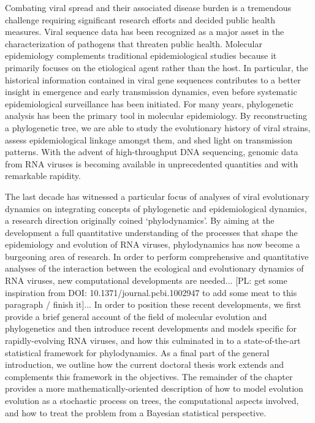 Combating viral spread and their associated disease burden is a tremendous challenge requiring significant research efforts and decided public health measures. 
Viral sequence data has been recognized as a major asset in the characterization of pathogens that threaten public health.
Molecular epidemiology complements traditional epidemiological studies because it primarily focuses on the etiological agent rather than the host. %
In particular, the historical information contained in viral gene sequences contributes to a better insight in emergence and early transmission dynamics, even before systematic epidemiological surveillance has been initiated. 
For many years, phylogenetic analysis has been the primary tool in molecular epidemiology. 
By reconstructing a phylogenetic tree, we are able to study the evolutionary history of viral strains, assess epidemiological linkage amongst them, and shed light on transmission patterns. 
With the advent of high-throughput DNA sequencing, genomic data from RNA viruses is becoming available in unprecedented quantities and with remarkable rapidity. 


The last decade has witnessed a particular focus of analyses of viral evolutionary dynamics on integrating concepts of phylogenetic and epidemiological dynamics, a research direction originally coined `phylodynamics'. %
By aiming at the development a full quantitative understanding of the processes that shape the epidemiology and evolution of RNA viruses,
phylodynamics has now become a burgeoning area of research.
In order to perform comprehensive and quantitative analyses of the interaction between the ecological and evolutionary dynamics of RNA viruses, new computational developments are needed... [PL: get some inspiration from  DOI: 10.1371/journal.pcbi.1002947 to add some meat to this paragraph / finish it]...
In order to position these recent developments, we first provide a brief general account of the field of molecular evolution and phylogenetics and then introduce recent developments and models specific for rapidly-evolving RNA viruses, and how this culminated in to a state-of-the-art statistical framework for phylodynamics. As a final part of the general introduction, we outline how the current doctoral thesis work extends and complements this framework in the objectives.
The remainder of the chapter provides a more mathematically-oriented description of how to model evolution evolution as a stochastic process on trees, the computational aspects involved, and how to treat the problem from a Bayesian statistical perspective.







